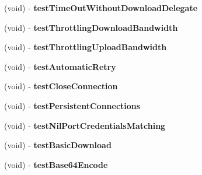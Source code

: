 \begin{DoxyCompactItemize}
\item 
\hypertarget{interface_a_s_i_h_t_t_p_request_tests_ae19beb94bca46a1dcb81e4729dc89f2f}{
(void) -\/ {\bfseries test\-Time\-Out\-Without\-Download\-Delegate}}
\label{interface_a_s_i_h_t_t_p_request_tests_ae19beb94bca46a1dcb81e4729dc89f2f}

\item 
\hypertarget{interface_a_s_i_h_t_t_p_request_tests_af14e80be1ca16f71c636a799356bb92d}{
(void) -\/ {\bfseries test\-Throttling\-Download\-Bandwidth}}
\label{interface_a_s_i_h_t_t_p_request_tests_af14e80be1ca16f71c636a799356bb92d}

\item 
\hypertarget{interface_a_s_i_h_t_t_p_request_tests_a65f252fc1eea28887974dd1ff8354609}{
(void) -\/ {\bfseries test\-Throttling\-Upload\-Bandwidth}}
\label{interface_a_s_i_h_t_t_p_request_tests_a65f252fc1eea28887974dd1ff8354609}

\item 
\hypertarget{interface_a_s_i_h_t_t_p_request_tests_aed737183009eb013ed056fb74423c9ab}{
(void) -\/ {\bfseries test\-Automatic\-Retry}}
\label{interface_a_s_i_h_t_t_p_request_tests_aed737183009eb013ed056fb74423c9ab}

\item 
\hypertarget{interface_a_s_i_h_t_t_p_request_tests_a266591fd53dafdd64e6b175e59f1439c}{
(void) -\/ {\bfseries test\-Close\-Connection}}
\label{interface_a_s_i_h_t_t_p_request_tests_a266591fd53dafdd64e6b175e59f1439c}

\item 
\hypertarget{interface_a_s_i_h_t_t_p_request_tests_a23d2a0e836cb5aa242ee26182047fc6b}{
(void) -\/ {\bfseries test\-Persistent\-Connections}}
\label{interface_a_s_i_h_t_t_p_request_tests_a23d2a0e836cb5aa242ee26182047fc6b}

\item 
\hypertarget{interface_a_s_i_h_t_t_p_request_tests_acbb0b3611836a7e04e7fe0b1072e0977}{
(void) -\/ {\bfseries test\-Nil\-Port\-Credentials\-Matching}}
\label{interface_a_s_i_h_t_t_p_request_tests_acbb0b3611836a7e04e7fe0b1072e0977}

\item 
\hypertarget{interface_a_s_i_h_t_t_p_request_tests_aeac324a706cb5b14402328ebfc9d5261}{
(void) -\/ {\bfseries test\-Basic\-Download}}
\label{interface_a_s_i_h_t_t_p_request_tests_aeac324a706cb5b14402328ebfc9d5261}

\item 
\hypertarget{interface_a_s_i_h_t_t_p_request_tests_a349b42dabf7c0b0ab4e91d6a64e9b114}{
(void) -\/ {\bfseries test\-Base64\-Encode}}
\label{interface_a_s_i_h_t_t_p_request_tests_a349b42dabf7c0b0ab4e91d6a64e9b114}


\end{DoxyCompactItemize}
